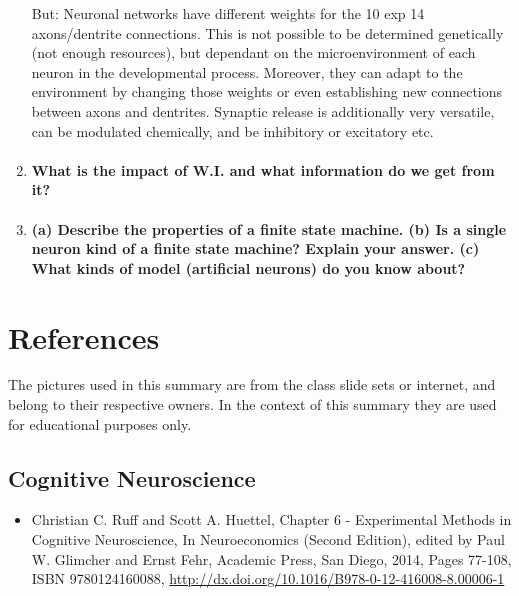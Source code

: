 \documentclass[12pt,article,oneside,a4paper]{memoir}
\begin{document}
\begin{enumerate}
	But: Neuronal networks have different weights for the 10 exp 14 axons/dentrite connections. This is not possible to be determined genetically (not enough resources), but dependant on the microenvironment of each neuron in the developmental process. Moreover, they can adapt to the environment by changing those weights or even establishing new connections between axons and dentrites.
	Synaptic release is additionally very versatile, can be modulated chemically, and be inhibitory or excitatory etc.

\item \paragraph{What is the impact of W.I. and what information do we get from it?}

\item \paragraph{ (a) Describe the properties of a finite state machine. (b) Is a single neuron kind of  a finite state machine? Explain your answer. (c) What kinds of model (artificial neurons) do you know about?}
\end{enumerate}




\newpage

\section{References}
The pictures used in this summary are from the class slide sets or internet, and belong to their respective owners. In the context of this summary they are used for educational purposes only.

\subsection{Cognitive Neuroscience}
\begin{itemize}
\item Christian C. Ruff and Scott A. Huettel, Chapter 6 - Experimental Methods in Cognitive Neuroscience, In Neuroeconomics (Second Edition), edited by Paul W. Glimcher and Ernst Fehr, Academic Press, San Diego, 2014, Pages 77-108, ISBN 9780124160088, \url{http://dx.doi.org/10.1016/B978-0-12-416008-8.00006-1}
\end{itemize}
\end{document}

